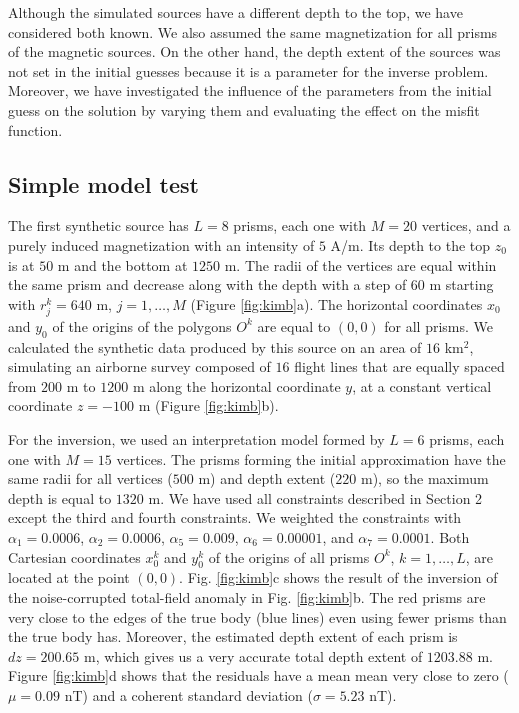 \documentclass[extra,mreferee]{gji}
\begin{document}
Although the simulated sources have a different depth to the top, we have considered both known. We also assumed the same magnetization for all prisms of the magnetic sources. On the other hand, the depth extent of the sources was not set in the initial guesses because it is a parameter for the inverse problem. Moreover, we have investigated the influence of the parameters from the initial guess on the solution by varying them and evaluating the effect on the misfit function.

\subsection{Simple model test}

The first synthetic source has $L=8$ prisms, each one with $M = 20$ vertices, and a purely induced magnetization with an intensity of $5$ A/m. Its depth to the top $z_0$ is at $50$ m and the bottom at $1250$ m. The radii of the vertices are equal within the same prism and decrease along with the depth with a step of $60$ m starting with $r_j^k=640$ m, $j=1,\dots, M$ (Figure \ref{fig:kimb}a). The horizontal coordinates $x_0$ and $y_0$ of the origins of the polygons $O^k$ are equal to $(0,0)$ for all prisms. We calculated the synthetic data produced by this source on an area of $16$ km$^2$, simulating an airborne survey composed of $16$ flight lines that are equally spaced from $200$ m to $1200$ m along the horizontal coordinate $y$, at a constant vertical coordinate $z=-100$ m (Figure \ref{fig:kimb}b).

For the inversion, we used an interpretation model formed by $L=6$ prisms, each one with $M=15$ vertices. The prisms forming the initial approximation have the same radii for all vertices ($500$ m) and depth extent ($220$ m), so the maximum depth is equal to $1320$ m. We have used all constraints described in Section 2 except the third and fourth constraints. We weighted the constraints with $\alpha_1 = 0.0006$, $\alpha_2 = 0.0006$, $\alpha_5 = 0.009$, $\alpha_6 = 0.00001$, and $\alpha_7 = 0.0001$. Both Cartesian coordinates $x_0^k$ and $y_0^k$ of the origins of all prisms $O^k$, $k=1,\dots,L$, are located at the point $(0,0)$. Fig. \ref{fig:kimb}c shows the result of the inversion of the noise-corrupted total-field anomaly in Fig. \ref{fig:kimb}b. The red prisms are very close to the edges of the true body (blue lines) even using fewer prisms than the true body has. Moreover, the estimated depth extent of each prism is $dz = 200.65$ m, which gives us a very accurate total depth extent of $1203.88$ m. Figure \ref{fig:kimb}d shows that the residuals have a mean mean very close to zero ($\mu=0.09$ nT) and a coherent standard deviation ($\sigma=5.23$ nT).
\end{document}
